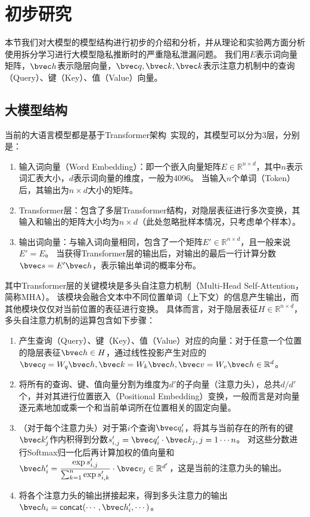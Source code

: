 \section{初步研究}
本节我们对大模型的模型结构进行初步的介绍和分析，并从理论和实验两方面分析使用拆分学习进行大模型隐私推断时的严重隐私泄漏问题。
%
我们用$E$表示词向量矩阵，$\bvec h$表示隐层向量，$\bvec q, \bvec k, \bvec k$表示注意力机制中的查询（Query）、键（Key）、值（Value）向量。
%


\subsection{大模型结构}
当前的大语言模型都是基于Transformer架构~\cite{vaswani_2017_attention}实现的，其模型可以分为3层，分别是：
\begin{enumerate}[label=(\arabic*)]
    \item 输入词向量（Word Embedding）：即一个嵌入向量矩阵$E \in \mathbb R^{n\times d}$，其中$n$表示词汇表大小，$d$表示词向量的维度，一般为4096。
    当输入$n$个单词（Token）后，其输出为$n \times d$大小的矩阵。
    \item Transformer层：包含了多层Transformer结构，对隐层表征进行多次变换，其输入和输出的矩阵大小均为$n \times d$（此处忽略批样本情况，只考虑单个样本）。
    \item 输出词向量：与输入词向量相同，包含了一个矩阵$E' \in \mathbb R^{n\times d}$，且一般来说$E' = E$。
    当获得Transformer层的输出后，对输出的最后一行计算分数$\bvec  s = E'\bvec h$，表示输出单词的概率分布。
\end{enumerate}

其中Transformer层的关键模块是多头自注意力机制（Multi-Head Self-Attention，简称MHA）。
%
该模块会融合文本中不同位置单词（上下文）的信息产生输出，而其他模块仅仅对当前位置的表征进行变换。
%
具体而言，对于隐层表征$H \in \mathbb R^{n\times d}$，多头自注意力机制的运算包含如下步骤：
\begin{enumerate}[label=(\arabic*)]
    \item 产生查询（Query）、键（Key）、值（Value）对应的向量：对于任意一个位置的隐层表征$\bvec h \in H$，通过线性投影产生对应的$\bvec q = W_q \bvec h, \bvec k = W_k \bvec h, \bvec v = W_v \bvec h \in \mathbb R^d$。
    \item 将所有的查询、键、值向量分割为维度为$d'$的子向量（注意力头），总共$d/d'$个，并对其进行位置嵌入（Positional Embedding）变换，一般而言是对向量逐元素地加或乘一个和当前单词所在位置相关的固定向量。
    \item （对于每个注意力头）对于第$i$个查询$\bvec q_i'$，将其与当前存在的所有的键$\bvec k'_j$作内积得到分数$s'_{i, j} = \bvec q_i' \cdot \bvec k_j, j = 1\cdots n$。
    对这些分数进行Softmax归一化后再计算加权的值向量和 $\bvec h'_i = \dfrac{\exp {s'_{i, j}}}{\sum_{k = 1}^n \exp {s'_{i, k}}} \cdot \bvec v_j \in \mathbb R^{d'}$，这是当前的注意力头的输出。
    \item 将各个注意力头的输出拼接起来，得到多头注意力的输出$\bvec h_i = \mathsf{concat}(\cdots, \bvec h'_i, \cdots)$。
\end{enumerate}

